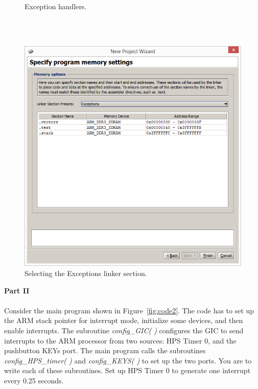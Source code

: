 \documentclass[epsfig,10pt,fullpage]{article}
\begin{document}
\begin{figure}[H]
\begin{center}

\end{center}
\vspace{-0.5cm}\caption{Exception handlers.}
\label{fig:irq_code}
\end{figure}
~\\
~\\
\begin{figure}[htb]
	\begin{center}
	\includegraphics[scale=0.58]{figures/exceptions.png}
	\end{center}
	\vspace{-0.25cm}\caption{Selecting the {\sf Exceptions} linker section.}
\label{fig:exceptions}
\end{figure}

\newpage
\noindent
{\bf Part II}
~\\
~\\
\noindent
Consider the main program shown in Figure~\ref{fig:code2}. The code has to set up 
the ARM stack pointer for interrupt mode, initialize some devices, and then enable interrupts.
The subroutine {\it config\_GIC( )} configures the GIC to send interrupts to the ARM 
processor from two sources: HPS Timer 0, and the pushbutton KEYs port. The main program calls the
subroutines {\it config\_HPS\_timer( )} and {\it config\_KEYS( )} to set up the two ports. You
are to write each of these subroutines. Set up HPS Timer 0 to generate one interrupt
every 0.25 seconds.
\end{document}
